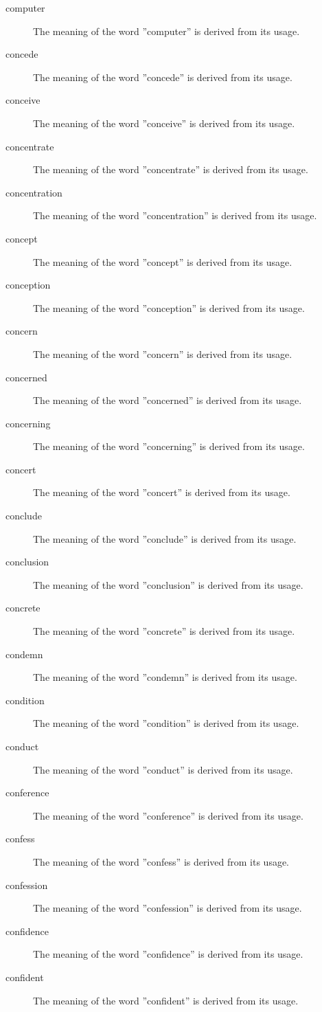 \documentclass[12pt, letterpaper]{memoir}
\begin{document}
\begin{description}
\item[computer] The meaning of the word ''computer'' is derived from its usage.
\item[concede] The meaning of the word ''concede'' is derived from its usage.
\item[conceive] The meaning of the word ''conceive'' is derived from its usage.
\item[concentrate] The meaning of the word ''concentrate'' is derived from its usage.
\item[concentration] The meaning of the word ''concentration'' is derived from its usage.
\item[concept] The meaning of the word ''concept'' is derived from its usage.
\item[conception] The meaning of the word ''conception'' is derived from its usage.
\item[concern] The meaning of the word ''concern'' is derived from its usage.
\item[concerned] The meaning of the word ''concerned'' is derived from its usage.
\item[concerning] The meaning of the word ''concerning'' is derived from its usage.
\item[concert] The meaning of the word ''concert'' is derived from its usage.
\item[conclude] The meaning of the word ''conclude'' is derived from its usage.
\item[conclusion] The meaning of the word ''conclusion'' is derived from its usage.
\item[concrete] The meaning of the word ''concrete'' is derived from its usage.
\item[condemn] The meaning of the word ''condemn'' is derived from its usage.
\item[condition] The meaning of the word ''condition'' is derived from its usage.
\item[conduct] The meaning of the word ''conduct'' is derived from its usage.
\item[conference] The meaning of the word ''conference'' is derived from its usage.
\item[confess] The meaning of the word ''confess'' is derived from its usage.
\item[confession] The meaning of the word ''confession'' is derived from its usage.
\item[confidence] The meaning of the word ''confidence'' is derived from its usage.
\item[confident] The meaning of the word ''confident'' is derived from its usage.

\end{description}
\end{document}
